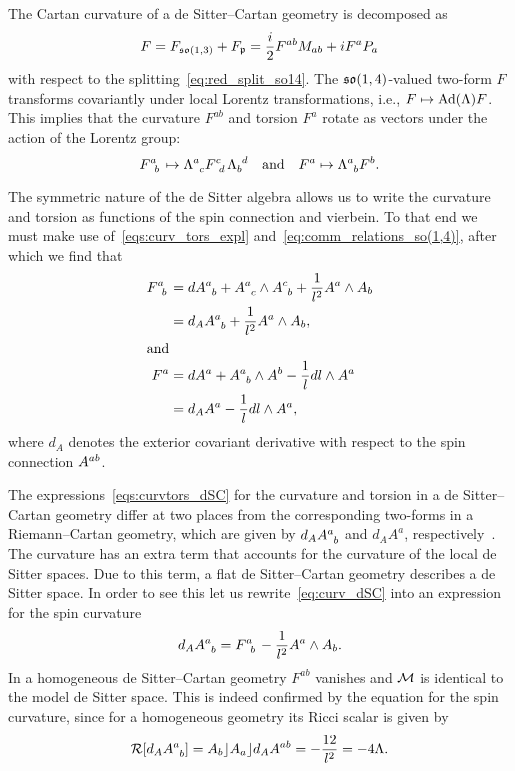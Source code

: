 \documentclass[
final,
11pt,
a4paper,
DIV=11,
headinclude=true,
footinclude=false,
bibliography=totoc,
twoside=true,  %
BCOR=5mm
]{scrbook}
\begin{document}
The Cartan curvature of a de Sitter--Cartan geometry is 
decomposed as
\begin{equation}
\label{eq:CartCurv_decomp}
  F = F_{\mathfrak{so}(1,3)} + F_\mathfrak{p}
  = \frac{i}{2} F^{ab} M_{ab} + i F^a P_a
\end{equation}
with respect to the splitting~\eqref{eq:red_split_so14}. The 
$\mathfrak{so}(1,4)$-valued two-form $F$ transforms covariantly under 
local Lorentz transformations, i.e., $F \mapsto \operatorname{Ad}(\Lambda) F$.  
This implies that the curvature $F^{ab}$ and torsion $F^a$ rotate 
as vectors under the action of the Lorentz group:
\begin{equation*}
  F\ind{^a_b} \mapsto \Lambda\ind{^a_c} F\ind{^c_d} 
  \Lambda\ind{_b^d}
  \quad\text{and}\quad
  F^a \mapsto \Lambda\ind{^a_b} F^b.
\end{equation*}

The symmetric nature of the de Sitter algebra allows us to write 
the curvature and torsion as functions of the spin connection and 
vierbein. To that end we must make use 
of~\eqref{eqs:curv_tors_expl} 
and~\eqref{eq:comm_relations_so(1,4)}, after which we find that
\begin{subequations}
\label{eqs:curvtors_dSC}
\begin{align}
\label{eq:curv_dSC}
  F\ind{^a_b} &= dA\ind{^a_b} + A\ind{^a_c} \wedge A\ind{^c_b} 
  + \frac{1}{l^2} A^a \wedge A_b \\
  \nonumber
  &= d_A A\ind{^a_b} + \frac{1}{l^2} A^a \wedge A_b,
  \\
\shortintertext{and}
\label{eq:tors_dSC}
  F^a &= dA^a + A\ind{^a_b} \wedge A^b - \frac{1}{l} dl \wedge 
  A^a 
  \\
  \nonumber
  &= d_A A^a - \frac{1}{l} dl \wedge A^a,
\end{align}
\end{subequations}
where $d_A$ denotes the exterior covariant derivative with 
respect to the spin connection $A\ind{^{ab}}$.

The expressions~\eqref{eqs:curvtors_dSC} for the curvature and 
torsion in a de Sitter--Cartan geometry differ at two places from 
the corresponding two-forms in a Riemann--Cartan geometry, which 
are given by $d_A A\ind{^a_b}$ and $d_A A^a$, 
respectively~\cite{Trautman:2006ec}. The curvature has an extra 
term that accounts for the curvature of the local de Sitter 
spaces. Due to this term, a flat de Sitter--Cartan geometry 
describes a de Sitter space. In order to see this let us 
rewrite~\eqref{eq:curv_dSC} into an expression for the spin 
curvature
\begin{equation*}
  d_A A\ind{^a_b} = F\ind{^a_b} - \frac{1}{l^2} A^a \wedge A_b.
\end{equation*}
In a homogeneous de Sitter--Cartan geometry $F^{ab}$ vanishes and 
$\mathcal{M}$ is identical to the model de Sitter space. This is 
indeed confirmed by the equation for the spin curvature, since 
for a homogeneous geometry its Ricci scalar is given by
\begin{equation*}
  \mc{R}[d_A A\ind{^a_b}] = A_b \ip A_a \ip d_A A^{ab} 
  = - \frac{12}{l^2} = -4\Lambda.
\end{equation*}
\end{document}
